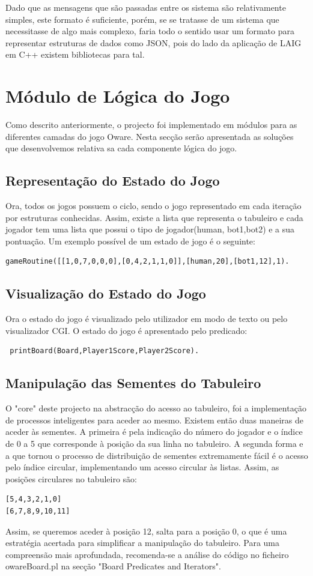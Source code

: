 \documentclass[15pt,a4paper]{article}
\begin{document}
Dado que as mensagens que são passadas entre os sistema são relativamente simples, este formato é suficiente, porém, se se tratasse de um sistema que necessitasse de algo mais complexo, faria todo o sentido usar um formato para representar estruturas de dados como JSON, pois do lado da aplicação de LAIG em C++ existem bibliotecas para tal.

\section{Módulo de Lógica do Jogo}
Como descrito anteriormente, o projecto foi implementado em módulos para as diferentes camadas do jogo Oware. Nesta secção serão apresentada as soluções que desenvolvemos relativa sa cada componente lógica do jogo.

\subsection{Representação do Estado do Jogo}
Ora, todos os jogos possuem o ciclo, sendo o jogo representado em cada iteração por estruturas conhecidas. Assim, existe a lista que representa o tabuleiro e cada jogador tem uma lista que possui o tipo de jogador(human, bot1,bot2) e a sua pontuação. Um exemplo possível de um estado de jogo é o seguinte:
\begin{verbatim}
gameRoutine([[1,0,7,0,0,0],[0,4,2,1,1,0]],[human,20],[bot1,12],1).
\end{verbatim}

\subsection{Visualização do Estado do Jogo}
Ora o estado do jogo é visualizado pelo utilizador em modo de texto ou pelo visualizador CGI. O estado do jogo é apresentado pelo predicado:
\begin{verbatim}
 printBoard(Board,Player1Score,Player2Score).
\end{verbatim}


\subsection{Manipulação das Sementes do Tabuleiro}
O "core" deste projecto na abstracção do acesso ao tabuleiro, foi a implementação de processos inteligentes para aceder ao mesmo. Existem então duas maneiras de aceder às sementes. A primeira é pela indicação do número do jogador e o índice de 0 a 5 que corresponde à posição da sua linha no tabuleiro. A segunda forma e a que tornou o processo de distribuição de sementes extremamente fácil é o acesso pelo índice circular, implementando um acesso circular às listas. Assim, as posições circulares no tabuleiro são:
\begin{verbatim}
[5,4,3,2,1,0]
[6,7,8,9,10,11]
\end{verbatim}
Assim, se queremos aceder à posição 12, salta para a posição 0, o que é uma estratégia acertada para simplificar a manipulação do tabuleiro. Para uma compreensão mais aprofundada, recomenda-se a análise do código no ficheiro owareBoard.pl na secção "Board Predicates and Iterators". 
\end{document}
